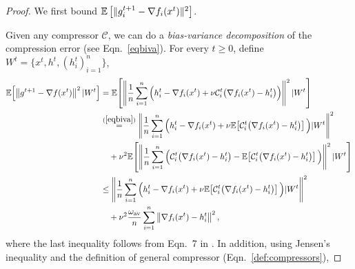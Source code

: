 \documentclass{article} %
\theoremstyle{plain}
\theoremstyle{definition}
\theoremstyle{remark}
\newcommand{\sqnorm}[1]{\left\| #1 \right\|^2}
\newcommand{\Exp}[1]{\mathbb{E}\!\left[ #1 \right]}
\newcommand{\oma}{\omega_{\mathrm{av}}}
\begin{document}
\begin{proof}
   We first bound $\mathbb{E}\left[\|g_i^{t+1} - \nabla f_i(x^{t})\|^2\right]$. 

   Given any compressor $\mathcal{C}$, we can do a {\it bias-variance decomposition} of the compression error (see Eqn.~\ref{eqbiva}). 
   For every $t\geq 0$, define $W^t = \{x^t, h^t, (h_i^t)_{i=1}^n\}$,
   \begin{equation}\label{eq0001}
   \begin{aligned}
      \Exp{\sqnorm{g^{t+1}-\nabla f(x^t)} | W^t} &=\Exp{\sqnorm{\frac{1}{n}\sum_{i=1}^n \Big(h_i^{t}-\nabla f_i(x^t) +\nu \mathcal{C}_i^t\big(\nabla f_i(x^t)-h_i^t\big) \Big) } | W^t}\\
      &\stackrel{(\ref{eqbiva})}{=}\sqnorm{\frac{1}{n}\sum_{i=1}^n \Big(h_i^{t}-\nabla f_i(x^t) +\nu \Exp{\mathcal{C}_i^t\big(\nabla f_i(x^t)-h_i^t\big)} \Big) | W^t} \\
      &\quad+\nu^2\Exp{\sqnorm{\frac{1}{n}\sum_{i=1}^n \Big( \mathcal{C}_i^t\big(\nabla f_i(x^t)-h_i^t\big)-\Exp{ \mathcal{C}_i^t\big(\nabla f_i(x^t)-h_i^t\big) } \Big) } | W^t}\\
      &\leq \sqnorm{\frac{1}{n}\sum_{i=1}^n \Big(h_i^{t}-\nabla f_i(x^t) +\nu \Exp{\mathcal{C}_i^t\big(\nabla f_i(x^t)-h_i^t\big)} \Big) | W^t}\\
      &\quad+\nu^2 \frac{\oma}{n}\sum_{i=1}^n \sqnorm{\nabla f_i(x^t)-h_i^t },
   \end{aligned}      
   \end{equation}
   where the last inequality follows from Eqn.~7 in \cite{condat2022ef}. In addition, using Jensen's inequality and the definition of general compressor (Eqn.~\ref{def:compressors}), 
 

\end{proof}
\end{document}
